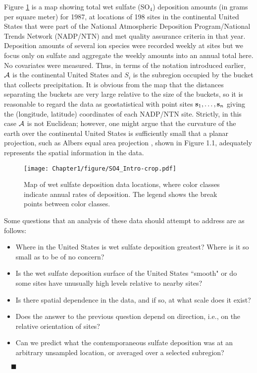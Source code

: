 Figure \ref{fig:SO4Intro} is a map showing total wet sulfate (SO$_4$) deposition amounts (in grams per square meter) for 1987, at locations of 198 sites in the continental United States that were part of the National Atmospheric Deposition Program/National Trends Network (NADP/NTN) and met quality assurance criteria in that year.  Deposition amounts of several ion species were recorded weekly at sites but we focus only on sulfate and  aggregate the weekly amounts into an annual total here.  No covariates were measured.  Thus, in terms of the notation introduced earlier, ${\cal A}$ is the continental United States and $S_i$ is the subregion occupied by the bucket that collects precipitation.  It is obvious from the map that the distances separating the buckets are very large relative to the size of the buckets, so it is reasonable to regard the data as geostatistical with point sites ${\bf s}_1,\ldots,{\bf s}_n$ giving the (longitude, latitude) coordinates of each NADP/NTN site.  Strictly, in this case ${\cal A}$ is not Euclidean; however, one might argue that the curvature of the earth over the continental United States is sufficiently small that a planar projection, such as Albers equal area projection \citep{snyder1987map}, shown in Figure 1.1, adequately represents the spatial information in the data.
\begin{figure}
\begin{center}
\texttt{[image: Chapter1/figure/SO4\_Intro-crop.pdf]}
\caption{Map of wet sulfate deposition data locations, where color classes indicate annual rates of deposition.  The legend shows the break points between color classes.
\label{fig:SO4Intro}}
\end{center}
\end{figure}


Some questions that an analysis of these data should attempt to address are as follows:
\begin{itemize}
\item Where in the United States is wet sulfate deposition greatest?  Where is it so small as to be of no concern?
\item Is the wet sulfate deposition surface of the United States ``smooth" or do some sites have unusually high levels relative to nearby sites?
\item Is there spatial dependence in the data, and if so, at what scale does it exist?
\item Does the answer to the previous question depend on direction, i.e., on the relative orientation of sites?
\item Can we predict what the contemporaneous sulfate deposition was at an arbitrary unsampled location, or averaged over a selected subregion?
\end{itemize}
$\quad\blacksquare$
\vspace{.5in}

